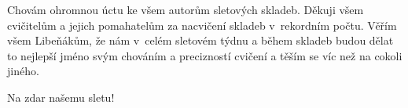 \documentclass[11pt]{article}
\begin{document}
Chovám ohromnou úctu ke všem autorům sletových skladeb. Děkuji všem cvičitelům a jejich pomahatelům za nacvičení skladeb v~rekordním počtu. Věřím všem Libeňákům, že nám v~celém sletovém týdnu a během skladeb budou dělat to nejlepší jméno svým chováním a precizností cvičení a těším se víc než na cokoli jiného.

\vspace*{\baselineskip}
\noindent
Na zdar našemu sletu!


\clearpage


\pagecolor{sokolred}
\color{white}
\renewcommand{\arraystretch}{1.2}

\newcommand{\boxheight}{14.5cm}

\vspace*{-20pt}
\end{document}
